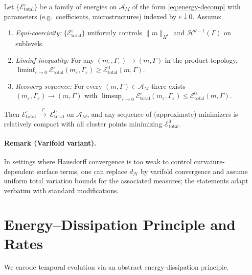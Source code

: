 \begin{theorem}\label{thm:gamma-scaffold}
Let $\{\mathcal{E}^{\varepsilon}_{\mathrm{total}}\}$ be a family of energies on $\mathcal{A}_{M}$ of the form \eqref{eq:energy-decomp} with parameters (e.g.~coefficients, microstructures) indexed by $\varepsilon\downarrow 0$.
Assume:
\begin{enumerate}[label=(\roman*)]
  \item \emph{Equi-coercivity:} $\{\mathcal{E}^{\varepsilon}_{\mathrm{total}}\}$ uniformly controls $\|m\|_{H^1}$ and $\mathcal{H}^{d-1}(\Gamma)$ on sublevels.
  \item \emph{Liminf inequality:} For any $(m_\varepsilon,\Gamma_\varepsilon)\to(m,\Gamma)$ in the product topology, 
  $\displaystyle \liminf_{\varepsilon\to 0}\mathcal{E}^{\varepsilon}_{\mathrm{total}}(m_\varepsilon,\Gamma_\varepsilon)\ge \mathcal{E}^0_{\mathrm{total}}(m,\Gamma)$.
  \item \emph{Recovery sequence:} For every $(m,\Gamma)\in\mathcal{A}_M$ there exists $(m_\varepsilon,\Gamma_\varepsilon)\to(m,\Gamma)$ with 
  $\displaystyle \limsup_{\varepsilon\to 0}\mathcal{E}^{\varepsilon}_{\mathrm{total}}(m_\varepsilon,\Gamma_\varepsilon)\le \mathcal{E}^0_{\mathrm{total}}(m,\Gamma)$.
\end{enumerate}
Then $\mathcal{E}^{\varepsilon}_{\mathrm{total}}\ \xrightarrow{\Gamma}\ \mathcal{E}^0_{\mathrm{total}}$ on $\mathcal{A}_M$, and any sequence of (approximate) minimizers is relatively compact with all cluster points minimizing $\mathcal{E}^0_{\mathrm{total}}$.
\end{theorem}

\paragraph{Remark (Varifold variant).}
In settings where Hausdorff convergence is too weak to control curvature-dependent surface terms, one can replace $d_{\mathcal{H}}$ by varifold convergence and assume uniform total variation bounds for the associated measures; the statements adapt verbatim with standard modifications.

\section{Energy--Dissipation Principle and Rates}\label{sec:edp}
We encode temporal evolution via an abstract energy-dissipation principle.

